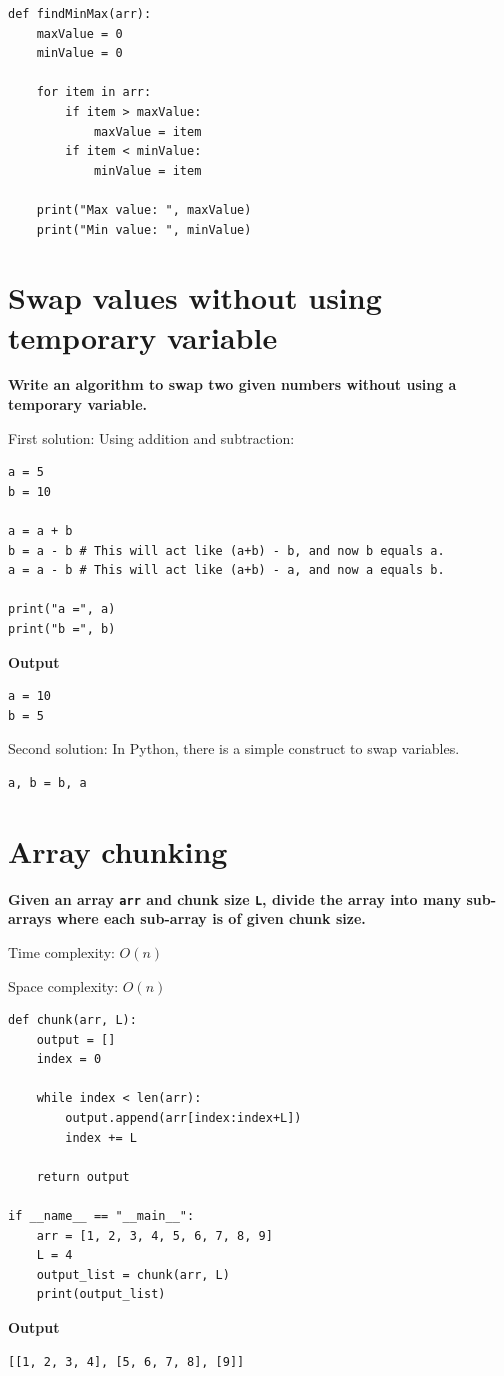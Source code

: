 \documentclass[a4paper,11pt]{book}
\begin{document}
\begin{lstlisting}
def findMinMax(arr):
    maxValue = 0
    minValue = 0
    
    for item in arr:
        if item > maxValue:
            maxValue = item
        if item < minValue:
            minValue = item
            
    print("Max value: ", maxValue)
    print("Min value: ", minValue)
\end{lstlisting}

\newpage
\section{Swap values without using temporary variable}

\noindent \textbf{Write an algorithm to swap two given numbers without using a temporary variable.}
\vspace{5mm}

\noindent First solution: Using addition and subtraction:
\begin{lstlisting}
a = 5
b = 10

a = a + b
b = a - b # This will act like (a+b) - b, and now b equals a.
a = a - b # This will act like (a+b) - a, and now a equals b.

print("a =", a)
print("b =", b)
\end{lstlisting}
\textbf{Output}
\begin{lstlisting}
a = 10
b = 5
\end{lstlisting}


\noindent Second solution: In Python, there is a simple construct to swap variables. 
\begin{lstlisting}
a, b = b, a
\end{lstlisting}

\newpage
\section{Array chunking}

\textbf{Given an array \lstinline{arr} and chunk size \lstinline{L}, divide the array into many sub-arrays where each sub-array is of given chunk size. }
\vspace{5mm}

\noindent Time complexity:  $O(n)$

\noindent Space complexity: $O(n)$

\begin{lstlisting}
def chunk(arr, L):
    output = []
    index = 0

    while index < len(arr):
        output.append(arr[index:index+L])
        index += L
    
    return output

if __name__ == "__main__":
    arr = [1, 2, 3, 4, 5, 6, 7, 8, 9]
    L = 4
    output_list = chunk(arr, L)
    print(output_list)
\end{lstlisting}
\textbf{Output}
\begin{lstlisting}
[[1, 2, 3, 4], [5, 6, 7, 8], [9]]
\end{lstlisting}
\end{document}
